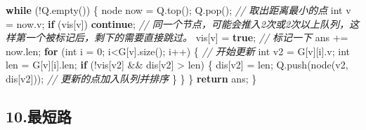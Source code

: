 \documentclass[
]{article}
\newenvironment{Shaded}{}{}
\newcommand{\CommentTok}[1]{\textcolor[rgb]{0.38,0.63,0.69}{\textit{#1}}}
\newcommand{\ControlFlowTok}[1]{\textcolor[rgb]{0.00,0.44,0.13}{\textbf{#1}}}
\newcommand{\DataTypeTok}[1]{\textcolor[rgb]{0.56,0.13,0.00}{#1}}
\newcommand{\DecValTok}[1]{\textcolor[rgb]{0.25,0.63,0.44}{#1}}
\newcommand{\KeywordTok}[1]{\textcolor[rgb]{0.00,0.44,0.13}{\textbf{#1}}}
\newcommand{\NormalTok}[1]{#1}
\newcommand{\OperatorTok}[1]{\textcolor[rgb]{0.40,0.40,0.40}{#1}}
\begin{document}
\begin{Shaded}
\begin{Highlighting}[]
    \ControlFlowTok{while} \OperatorTok{(!}\NormalTok{Q}\OperatorTok{.}\NormalTok{empty}\OperatorTok{())} \OperatorTok{\{}   
\NormalTok{        node now }\OperatorTok{=}\NormalTok{ Q}\OperatorTok{.}\NormalTok{top}\OperatorTok{();}\NormalTok{ Q}\OperatorTok{.}\NormalTok{pop}\OperatorTok{();}  \CommentTok{// 取出距离最小的点  }
        \DataTypeTok{int}\NormalTok{ v }\OperatorTok{=}\NormalTok{ now}\OperatorTok{.}\NormalTok{v}\OperatorTok{;}  
        \ControlFlowTok{if} \OperatorTok{(}\NormalTok{vis}\OperatorTok{[}\NormalTok{v}\OperatorTok{])} \ControlFlowTok{continue}\OperatorTok{;}  \CommentTok{// 同一个节点，可能会推入2次或2次以上队列，这样第一个被标记后，剩下的需要直接跳过。  }
\NormalTok{        vis}\OperatorTok{[}\NormalTok{v}\OperatorTok{]} \OperatorTok{=} \KeywordTok{true}\OperatorTok{;}  \CommentTok{// 标记一下  }
\NormalTok{        ans }\OperatorTok{+=}\NormalTok{ now}\OperatorTok{.}\NormalTok{len}\OperatorTok{;}  
        \ControlFlowTok{for} \OperatorTok{(}\DataTypeTok{int}\NormalTok{ i }\OperatorTok{=} \DecValTok{0}\OperatorTok{;}\NormalTok{ i}\OperatorTok{\textless{}}\NormalTok{G}\OperatorTok{[}\NormalTok{v}\OperatorTok{].}\NormalTok{size}\OperatorTok{();}\NormalTok{ i}\OperatorTok{++)} \OperatorTok{\{}  \CommentTok{// 开始更新  }
            \DataTypeTok{int}\NormalTok{ v2 }\OperatorTok{=}\NormalTok{ G}\OperatorTok{[}\NormalTok{v}\OperatorTok{][}\NormalTok{i}\OperatorTok{].}\NormalTok{v}\OperatorTok{;}  
            \DataTypeTok{int}\NormalTok{ len }\OperatorTok{=}\NormalTok{ G}\OperatorTok{[}\NormalTok{v}\OperatorTok{][}\NormalTok{i}\OperatorTok{].}\NormalTok{len}\OperatorTok{;}  
            \ControlFlowTok{if} \OperatorTok{(!}\NormalTok{vis}\OperatorTok{[}\NormalTok{v2}\OperatorTok{]} \OperatorTok{\&\&}\NormalTok{ dis}\OperatorTok{[}\NormalTok{v2}\OperatorTok{]} \OperatorTok{\textgreater{}}\NormalTok{ len}\OperatorTok{)} \OperatorTok{\{}   
\NormalTok{                dis}\OperatorTok{[}\NormalTok{v2}\OperatorTok{]} \OperatorTok{=}\NormalTok{ len}\OperatorTok{;}  
\NormalTok{                Q}\OperatorTok{.}\NormalTok{push}\OperatorTok{(}\NormalTok{node}\OperatorTok{(}\NormalTok{v2}\OperatorTok{,}\NormalTok{ dis}\OperatorTok{[}\NormalTok{v2}\OperatorTok{]));}  \CommentTok{// 更新的点加入队列并排序  }
            \OperatorTok{\}}  
        \OperatorTok{\}}  
    \OperatorTok{\}}  
    \ControlFlowTok{return}\NormalTok{ ans}\OperatorTok{;} 
\OperatorTok{\}}  
\end{Highlighting}
\end{Shaded}

\hypertarget{10ux6700ux77edux8def}{%
\subsection{10.最短路}\label{10ux6700ux77edux8def}}
\end{document}
